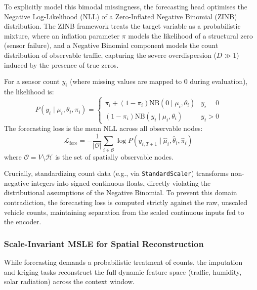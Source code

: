 To explicitly model this bimodal missingness, the forecasting head optimises the Negative Log-Likelihood (NLL) of a Zero-Inflated Negative Binomial (ZINB) distribution. The ZINB framework treats the target variable as a probabilistic mixture, where an inflation parameter $\pi$ models the likelihood of a structural zero (sensor failure), and a Negative Binomial component models the count distribution of observable traffic, capturing the severe overdispersion ($D \gg 1$) induced by the presence of true zeros.

For a sensor count $y_i$ (where missing values are mapped to $0$ during evaluation), the likelihood is:
\begin{equation}
    P(y_i \mid \mu_i, \theta_i, \pi_i) = 
    \begin{cases} 
      \pi_i + (1 - \pi_i) \text{NB}(0 \mid \mu_i, \theta_i) & y_i = 0 \\
      (1 - \pi_i) \text{NB}(y_i \mid \mu_i, \theta_i) & y_i > 0
    \end{cases}
    \label{eq:zinb_likelihood}
\end{equation}
The forecasting loss is the mean NLL across all observable nodes:
\begin{equation}
    \mathcal{L}_{\text{fore}} = -\frac{1}{|\mathcal{O}|} \sum_{i \in \mathcal{O}} \log P(y_{i, T+1} \mid \hat{\mu}_i, \hat{\theta}_i, \hat{\pi}_i)
    \label{eq:loss-fore}
\end{equation}
where $\mathcal{O} = V \setminus \mathcal{H}$ is the set of spatially observable nodes. 

Crucially, standardizing count data (e.g., via \texttt{StandardScaler}) transforms non-negative integers into signed continuous floats, directly violating the distributional assumptions of the Negative Binomial. To prevent this domain contradiction, the forecasting loss is computed strictly against the raw, unscaled vehicle counts, maintaining separation from the scaled continuous inputs fed to the encoder.

\subsubsection{Scale-Invariant MSLE for Spatial Reconstruction}
\label{subsubsec:meth-msle}

While forecasting demands a probabilistic treatment of counts, the imputation and kriging tasks reconstruct the full dynamic feature space (traffic, humidity, solar radiation) across the context window. 

